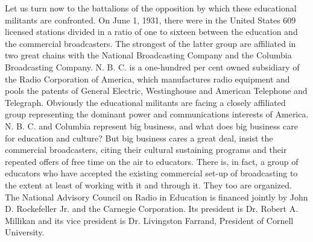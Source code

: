 Let us turn now to the battalions of the opposition by which these
educational militants are confronted. On June 1, 1931, there were in the
United States 609 licensed stations divided in a ratio of one to sixteen
between the education and the commercial broadcasters. The strongest of
the latter group are affiliated in two great chains with the National
Broadcasting Company and the Columbia Broadcasting Company. N. B. C. is
a one-hundred per cent owned subsidiary of the Radio Corporation of
America, which manufactures radio equipment and pools the patents of
General Electric, Westinghouse and American Telephone and Telegraph.
Obviously the educational militants are facing a closely affiliated
group representing the dominant power and communications interests of
America. N. B. C. and Columbia represent big business, and what does big
business care for education and culture? But big business cares a great
deal, insist the commercial broadcasters, citing their cultural
sustaining programs and their repeated offers of free time on the air to
educators. There is, in fact, a group of educators who have accepted the
existing commercial set-up of broadcasting to the extent at least of
working with it and through it. They too are organized. The National
Advisory Council on Radio in Education is financed jointly by John D.
Rockefeller Jr. and the Carnegie Corporation. Its president is Dr.
Robert A. Millikan and its vice president is Dr. Livingston Farrand,
President of Cornell University.

